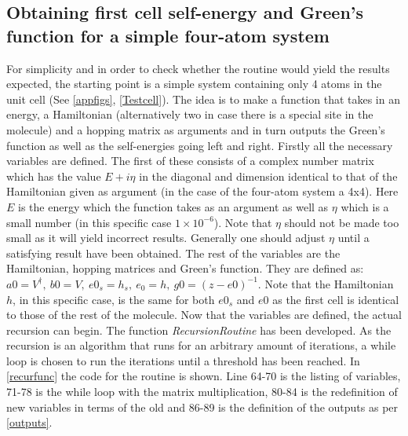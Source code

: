 \subsection{Obtaining first cell self-energy and Green's function for a simple four-atom system}\label{recursionroutinesec}
For simplicity and in order to check whether the routine would yield the results expected, the starting point is a simple system containing only 4 atoms in the unit cell (See \cref{appfigs}, \cref{Testcell}). The idea is to make a function that takes in an energy, a Hamiltonian (alternatively two in case there is a special site in the molecule) and a hopping matrix as arguments and in turn outputs the Green's function as well as the self-energies going left and right. Firstly all the necessary variables are defined. The first of these consists of a complex number matrix which has the value \(E + i\eta\) in the diagonal and dimension identical to that of the Hamiltonian given as argument (in the case of the four-atom system a 4x4). Here \(E\) is the energy which the function takes as an argument as well as \(\eta\) which is a small number (in this specific case \(1\times10^{-6}\)). Note that \(\eta\) should not be made too small as it will yield incorrect results. Generally one should adjust \(\eta\) until a satisfying result have been obtained. The rest of the variables are the Hamiltonian, hopping matrices and Green's function. They are defined as: \(a0 = V^{\dagger}, \ b0 = V, \ e0_{s} = h_s, \ e_{0} = h, \ g0 = (z-e0)^{-1}\). Note that the Hamiltonian \(h\), in this specific case, is the same for both \(e0_{s}\) and \(e0\) as the first cell is identical to those of the rest of the molecule. Now that the variables are defined, the actual recursion can begin. The function \textit{RecursionRoutine} has been developed. As the recursion is an algorithm that runs for an arbitrary amount of iterations, a while loop is chosen to run the iterations until a threshold has been reached. In \cref{recurfunc} the code for the routine is shown. Line 64-70 is the listing of variables, 71-78 is the while loop with the matrix multiplication, 80-84 is the redefinition of new variables in terms of the old and 86-89 is the definition of the outputs as per \cref{outputs}.\\
\newpage
{}
\vspace{-1\baselineskip}
\vspace{\baselineskip}\newpage
